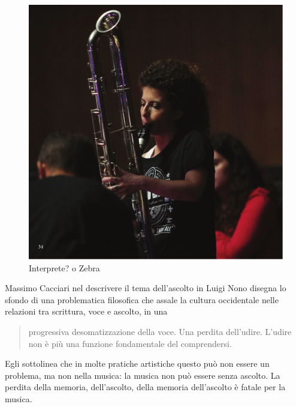 \documentclass{gs-adonis}
\begin{document}

\begin{figure}[t]
  \centering
  \includegraphics[width=\linewidth]{images/panthera.pdf}
  \captionsetup{width=.81\linewidth}
  \caption{Interprete? o Zebra}
  \label{alice}
\end{figure}

Massimo Cacciari nel descrivere il tema dell'ascolto in Luigi Nono
\cite{Cacciari1995} disegna lo sfondo di una problematica filosofica che assale
la cultura occidentale nelle relazioni tra scrittura, voce e ascolto, %
in una

\begin{quote}
  progressiva desomatizzazione della voce. Una perdita dell'udire. L'udire
  non è più una funzione fondamentale del comprendersi. \cite{Cacciari1995}
\end{quote}

Egli sottolinea che in molte pratiche artistiche questo può non essere un
problema, ma non nella musica: la musica non può essere senza ascolto.
La perdita della memoria, dell'ascolto, della memoria dell'ascolto è fatale
per la musica. %
\end{document}
